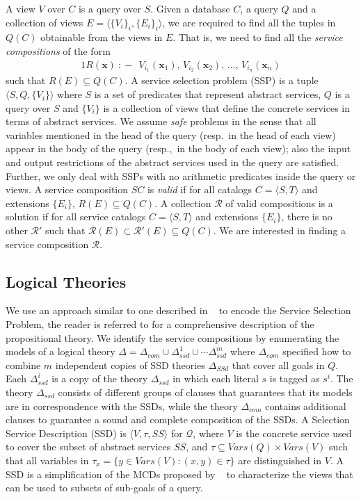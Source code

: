 \documentclass{llncs}
\newcommand{\tup}[1]{\langle #1 \rangle}
\newcommand{\vvec}[1]{\mathbf{#1}}
\newcommand{\R}{\mathcal{R}}
\newcommand{\Q}{\mathcal{Q}}
\newcommand{\qrule}{:\!\!-}
\begin{document}
A view $V$ over $C$ is a query over $S$. Given a database $C$, a query $Q$ and a collection of 
views $E=\tup{\{V_i\}_i,\{E_i\}_i}$, we are required to find
all the tuples in $Q(C)$ obtainable from the views in $E$.
That is, we need to find all the \emph{service compositions} of the form
\begin{alignat*}{1}
R(\vvec{x})\ \qrule\ \ V_{i_1}(\vvec{x}_1),\, V_{i_2}(\vvec{x}_2),\, \ldots,\, V_{i_n}(\vvec{x}_n)
\end{alignat*}
such that $R(E) \subseteq Q(C)$.
A service selection problem (SSP) is a tuple $\tup{S,Q,\{V_i\}}$ where $S$
is a set of predicates that represent abstract services, $Q$ is a query over $S$ and $\{V_i\}$ is a collection of views that define the concrete services in terms of  abstract services. We assume \emph{safe} problems in the sense that all 
variables mentioned in the head of the query (resp.\ in the head of each view)
appear in the body of the query (resp.,\ in the body of each view); also the input and output restrictions of the abstract services used in the query are satisfied.
Further, we only deal with SSPs with no arithmetic predicates inside the
query or views.
A service composition $SC$ is \emph{valid} if for all catalogs $C=\tup{S,T}$
and extensions $\{E_i\}$, $R(E) \subseteq Q(C)$.
A collection $\R$ of valid compositions is a solution if
for all service catalogs $C=\tup{S,T}$ and extensions $\{E_i\}$, there
is no other $\R'$ such that $\R(E)\subset\R'(E)\subseteq Q(C)$.
We are interested in finding a service composition $\R$.

\subsection{Logical Theories}
We use an approach similar to one described in ~\cite{arvelo:aaai06} to encode the Service Selection Problem, the reader is referred to \cite{arvelo:aaai06} for a comprehensive
description of the propositional theory. We identify the service compositions by enumerating the
models of a logical theory $\Delta=\Delta_{com}\cup\Delta_{ssd}^1\cup\cdots\Delta_{ssd}^m$
where $\Delta_{com}$ specified how to combine $m$ independent
copies of SSD theories $\Delta_{SSd}$ that cover all goals in $Q$.
Each $\Delta^i_{ssd}$ is a copy of the theory $\Delta_{ssd}$
in which each literal $s$ is tagged as $s^i$.
The theory $\Delta_{ssd}$ consists of different groups of 
clauses that guarantees that its models are in correspondence
with the SSDs, while the theory $\Delta_{com}$ contains additional
clauses to guarantee a sound and complete composition of the SSDs.
A Selection Service Description (SSD) is  $\tup{V,\tau,SS}$ for $\Q$, where $V$ is the concrete service used to cover the subset of abstract services $SS$, and  $\tau\subseteq Vars(Q)\times Vars(V)$ such that all variables in
$\tau_x=\{ y\in Vars(V) : (x,y)\in\tau\}$ are distinguished in $V$. A SSD is a simplification of the MCDs proposed by ~\cite{pottinger:minicon} to characterize the views that can be used to subsets of sub-goals of a query. 
\end{document}
